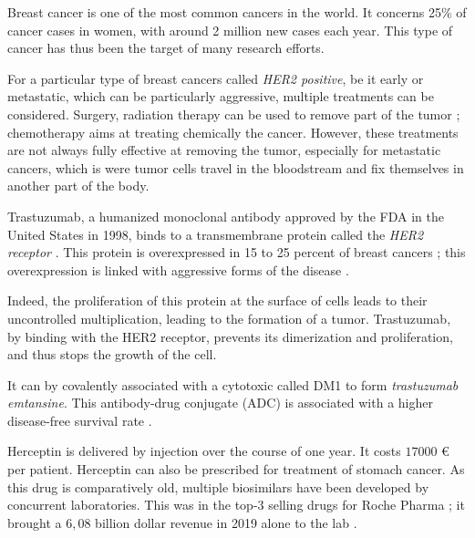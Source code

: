 Breast cancer is one of the most common cancers in the world.
It concerns 25\% of cancer cases in women, with around 2 million new cases
each year. This type of cancer has thus been the target of many research efforts.

For a particular type of breast cancers called \emph{HER2 positive}, be it early 
or metastatic, which can be particularly aggressive, multiple treatments can
be considered. Surgery, radiation therapy can be used to remove part of the tumor ;
chemotherapy aims at treating chemically the cancer. However, these treatments are
not always fully effective at removing the tumor, especially for metastatic cancers,
which is were tumor cells travel in the bloodstream and fix themselves in another
part of the body.

Trastuzumab, a humanized monoclonal antibody approved by the FDA in the 
United States in 1998, binds to a transmembrane protein called 
the \emph{HER2 receptor} \cite{zhao_trastuzumab_2021}. This protein is
overexpressed in 15 to 25 percent of breast cancers ; this overexpression
is linked with aggressive forms of the disease \cite{piccart-gebhart_trastuzumab_2005}.

Indeed, the proliferation of this protein at the surface of cells leads to their
uncontrolled multiplication, leading to the formation of a tumor.
Trastuzumab, by binding with the HER2 receptor, prevents its dimerization and
proliferation, and thus stops the growth of the cell.

It can by covalently associated with a cytotoxic called DM1 to form
\emph{trastuzumab emtansine}. This antibody-drug conjugate (ADC) 
is associated with a higher disease-free survival rate
\cite{lambert_ado-trastuzumab_2014}.

Herceptin is delivered by injection over the course of one year.
It costs $17000$ € per patient. Herceptin can also be prescribed for treatment of stomach cancer. 
As this drug is comparatively old, multiple
biosimilars have been developed by concurrent laboratories. This was in the
top-3 selling drugs for Roche Pharma ; it brought a $6,08$ billion dollar
revenue in 2019 alone to the lab \cite{fierce_pharma_herceptin_2020}.

